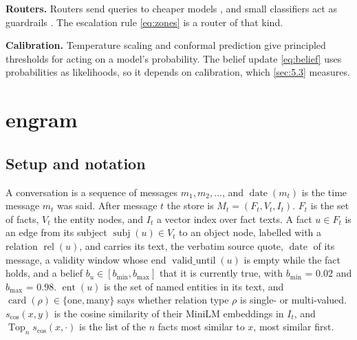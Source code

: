 \documentclass[11pt]{article}
\newcommand{\src}[1]{}
\begin{document}
\textbf{Routers.} Routers send queries to cheaper models \citep{ong2025routellm,chen2024frugalgpt}, and small classifiers act as guardrails \citep{inan2023llamaguard}. The escalation rule \cref{eq:zones} is a router of that kind.

\textbf{Calibration.} Temperature scaling \citep{guo2017calibration} and conformal prediction \citep{angelopoulos2021conformal} give principled thresholds for acting on a model's probability. The belief update \cref{eq:belief} uses probabilities as likelihoods, so it depends on calibration, which \cref{sec:5.3} measures.

\section{engram}\label{sec:3}
\subsection{Setup and notation}\label{sec:3.1}
A conversation is a sequence of messages $m_1, m_2, \ldots$, and $\operatorname{date}(m_t)$ is the time message $m_t$ was said. After message $t$ the store is $M_t = (F_t, V_t, I_t)$. $F_t$ is the set of facts, $V_t$ the entity nodes, and $I_t$ a vector index over fact texts. A fact $u \in F_t$ is an edge from its subject $\operatorname{subj}(u) \in V_t$ to an object node, labelled with a relation $\operatorname{rel}(u)$, and carries its text, the verbatim source quote, $\operatorname{date}$ of its message, a validity window whose end $\operatorname{valid\_until}(u)$ is empty while the fact holds, and a belief $b_u \in [b_{\min}, b_{\max}]$ that it is currently true, with $b_{\min}$ = 0.02\src{src/engram/config.py} and $b_{\max}$ = 0.98\src{src/engram/config.py}. $\operatorname{ent}(u)$ is the set of named entities in its text, and $\operatorname{card}(\rho) \in \{\text{one}, \text{many}\}$ says whether relation type $\rho$ is single- or multi-valued. $s_{\cos}(x, y)$ is the cosine similarity of their MiniLM embeddings in $I_t$, and $\operatorname{Top}_n s_{\cos}(x, \cdot)$ is the list of the $n$ facts most similar to $x$, most similar first.
\end{document}
